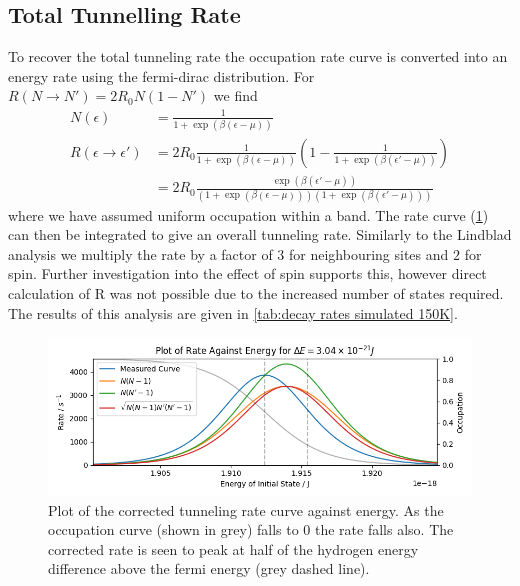 \subsection{Total Tunnelling Rate}
To recover the total tunneling
rate the occupation rate curve
is converted into an
energy rate using the
fermi-dirac distribution.
For \(R(N\rightarrow{}N') = 2R_0N(1-N')\)
we find
\begin{align}
    N(\epsilon)                         & = \frac{1}{1 + \exp{(\beta(\epsilon - \mu))}}                                                                         \\
    R(\epsilon \rightarrow{} \epsilon') & = 2R_0 \frac{1}{1 + \exp{(\beta(\epsilon - \mu))}}(1- \frac{1}{1 + \exp{(\beta(\epsilon' - \mu))}})                   \\
                                        & = 2R_0 \frac{\exp{(\beta(\epsilon' - \mu))}}{(1 + \exp{(\beta(\epsilon - \mu))})(1 + \exp{(\beta(\epsilon' - \mu))})}
\end{align}
where we have assumed uniform
occupation within a band.
The rate curve
(\cref{fig:tunneling rate against energy})
can then be
integrated to give an
overall tunneling rate.
Similarly to the Lindblad
analysis we multiply the
rate by a factor of \(3\)
for neighbouring sites
and \(2\) for spin.
Further investigation into
the effect of spin supports
this, however direct
calculation of R was
not possible due to
the increased number of states required.
The results of this
analysis are given
in \cref{tab:decay rates simulated 150K}.
\begin{figure}[htbp]
    \centering
    \includegraphics[width =0.9 \linewidth]{Figures/Simulation/Corrected Decay Rates.png}
    \caption{Plot of the corrected
        tunneling rate curve against
        energy. As the occupation curve
        (shown in grey) falls to 0
        the rate falls also. The corrected
        rate is seen to peak at half of the hydrogen
        energy difference above the fermi
        energy (grey dashed line).
    }\label{fig:tunneling rate against energy}
\end{figure}

